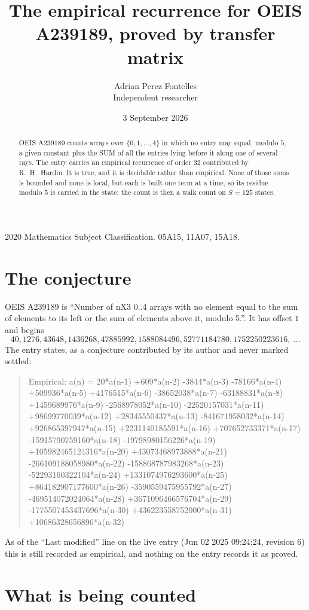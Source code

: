 \documentclass[11pt,a4paper]{article}
\title{The empirical recurrence for OEIS A239189, proved by transfer matrix}
\author{Adrian Perez Fontelles\\ \small Independent researcher}
\date{3 September 2026}
\theoremstyle{plain}
\theoremstyle{definition}
\begin{document}
\maketitle

\begin{abstract}
OEIS A239189 counts arrays over $\{0,1,\dots,4\}$ in which no entry may equal, modulo $5$, a given
constant plus the SUM of all the entries lying before it along one of several rays. The entry
carries an empirical recurrence of order $32$ contributed by R.~H.~Hardin. It is true, and
it is decidable rather than empirical. None of those sums is bounded and none is local, but
each is built one term at a time, so its residue modulo $5$ is carried in the state; the
count is then a walk count on $S=125$ states.
\end{abstract}

\noindent\small 2020 Mathematics Subject Classification. 05A15, 11A07, 15A18.\normalsize

\section{The conjecture}

OEIS A239189 is ``Number of nX3 0..4 arrays with no element equal to the sum of elements to its left or the sum of elements above it, modulo 5.''. It has offset $1$ and begins
\[
40, 1276, 43648, 1436268, 47885992, 1588084496, 52771184780, 1752250223616,\ \dots
\]
The entry states, as a conjecture contributed by its author and never marked settled:
\begin{quote}
Empirical: a(n) = 20*a(n-1) +609*a(n-2) -3844*a(n-3) -78166*a(n-4) +509936*a(n-5) +4176515*a(n-6) -38652038*a(n-7) -63188831*a(n-8) +1459689976*a(n-9) -2568978052*a(n-10) -22520157031*a(n-11) +98699770039*a(n-12) +28345550437*a(n-13) -841671958032*a(n-14) +926865397947*a(n-15) +2231140185591*a(n-16) +707652733371*a(n-17) -15915790759160*a(n-18) -19798980156226*a(n-19) +105982465124316*a(n-20) +43073468973888*a(n-21) -266109188058980*a(n-22) -158868787983268*a(n-23) -52293160322104*a(n-24) +1331074976293600*a(n-25) +864182907177600*a(n-26) -3590559475955792*a(n-27) -469514072024064*a(n-28) +3671096466576704*a(n-29) -1775507453437696*a(n-30) +436223558752000*a(n-31) +10686328656896*a(n-32)
\end{quote}
As of the ``Last modified'' line on the live entry (Jun 02 2025 09:24:24, revision 6) this is still
recorded as empirical, and nothing on the entry records it as proved.

\section{What is being counted}
\end{document}
